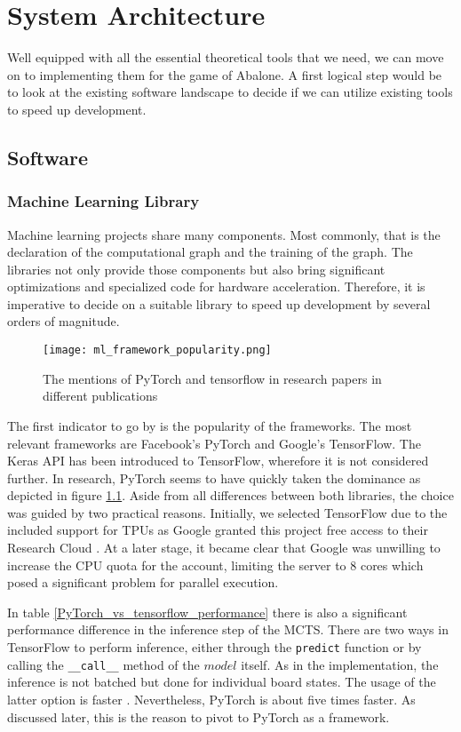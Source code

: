 \chapter{System Architecture}
\label{system-architecture}
Well equipped with all the essential theoretical tools that we need, we can move on to implementing them for the game of Abalone. A first logical step would be to look at the existing software landscape to decide if we can utilize existing tools to speed up development.

\section{Software}
\subsection{Machine Learning Library}
Machine learning projects share many components. Most commonly, that is the declaration of the computational graph and the training of the graph. The libraries not only provide those components but also bring significant optimizations and specialized code for hardware acceleration. Therefore, it is imperative to decide on a suitable library to speed up development by several orders of magnitude.

\begin{figure}
    \centering
    \texttt{[image: ml\_framework\_popularity.png]}
    \caption{The mentions of PyTorch and tensorflow in research papers in different publications \cite{noauthor_state_2019}}
    \label{ml_framework_popularity}
\end{figure}

The first indicator to go by is the popularity of the frameworks. The most relevant frameworks are Facebook's PyTorch and Google's TensorFlow. The Keras API has been introduced to TensorFlow, wherefore it is not considered further. In research, PyTorch seems to have quickly taken the dominance as depicted in figure \ref{ml_framework_popularity}. Aside from all differences between both libraries, the choice was guided by two practical reasons. Initially, we selected TensorFlow due to the included support for TPUs as Google granted this project free access to their Research Cloud \cite{noauthor_tpu_nodate}. At a later stage, it became clear that Google was unwilling to increase the CPU quota for the account, limiting the server to 8 cores which posed a significant problem for parallel execution.

In table \ref{PyTorch_vs_tensorflow_performance} there is also a significant performance difference in the inference step of the MCTS. There are two ways in TensorFlow to perform inference, either through the \texttt{predict} function or by calling the \texttt{\_\_call\_\_} method of the $model$ itself. As in the implementation, the inference is not batched but done for individual board states. The usage of the latter option is faster \cite{noauthor_tfkerasmodel_nodate}. Nevertheless, PyTorch is about five times faster. As discussed later, this is the reason to pivot to PyTorch as a framework.


